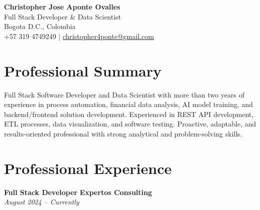 \documentclass[11pt,a4paper]{article}
\begin{document}
\begin{center}
    {\LARGE \textbf{Christopher Jose Aponte Ovalles}}\\[5pt]
    {\large Full Stack Developer \& Data Scientist}\\[6pt]
    Bogota D.C., Colombia \\
    +57 319 4749249 \quad | \quad
    \href{mailto:christopher4ponte@gmail.com}{christopher4ponte@gmail.com}
\end{center}

\vspace{0.3cm}

\section*{Professional Summary}

Full Stack Software Developer and Data Scientist with more than two years of experience in process automation, financial data analysis, AI model training, and backend/frontend solution development. Experienced in REST API development, ETL processes, data visualization, and software testing. Proactive, adaptable, and results-oriented professional with strong analytical and problem-solving skills.

\section*{Professional Experience}

\textbf{Full Stack Developer} \hfill \textbf{Expertos Consulting}\\
\textit{August 2024 -- Currently}
\end{document}
